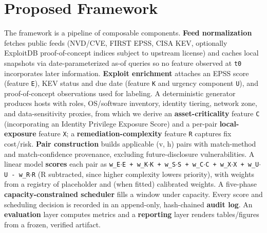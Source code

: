 \section{Proposed Framework}

The framework is a pipeline of composable components. \textbf{Feed normalization}
fetches public feeds (NVD/CVE, FIRST EPSS, CISA KEV, optionally ExploitDB
proof-of-concept indices subject to upstream license) and caches local snapshots
via date-parameterized as-of queries so no feature observed at \texttt{t0} incorporates
later information. \textbf{Exploit enrichment} attaches an EPSS score (feature \texttt{E}), KEV
status and due date (feature \texttt{K} and urgency component \texttt{U}), and proof-of-concept
observations used for labeling. A deterministic generator produces hosts with
roles, OS/software inventory, identity tiering, network zone, and data-sensitivity
proxies, from which we derive an \textbf{asset-criticality} feature \texttt{C} (incorporating
an Identity Privilege Exposure Score) and a per-pair \textbf{local-exposure} feature
\texttt{X}; a \textbf{remediation-complexity} feature \texttt{R} captures fix cost/risk.
\textbf{Pair construction} builds applicable (v, h) pairs with match-method and
match-confidence provenance, excluding future-disclosure vulnerabilities. A linear
model \textbf{scores} each pair as
\texttt{w\_E$\cdot$E + w\_K$\cdot$K + w\_S$\cdot$S + w\_C$\cdot$C + w\_X$\cdot$X + w\_U$\cdot$U - w\_R$\cdot$R} (R subtracted, since higher
complexity lowers priority), with weights from a registry of placeholder and (when
fitted) calibrated weights. A five-phase \textbf{capacity-constrained scheduler} fills a
window under capacity. Every score and scheduling decision is recorded in an
append-only, hash-chained \textbf{audit log}. An \textbf{evaluation} layer computes metrics
and a \textbf{reporting} layer renders tables/figures from a frozen, verified artifact.
